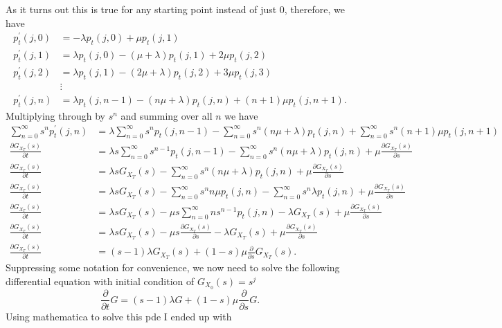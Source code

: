 \documentclass[10pt]{amsart}
\begin{document}
As it turns out this is true for any starting point instead of just 0, therefore, we have
\begin{align*}
p^\prime_t(j,0) &= -\lambda p_t(j,0) + \mu p_t(j,1) \\
p^\prime_t(j,1) &= \lambda p_t(j,0) - (\mu + \lambda) p_t(j,1) + 2\mu p_t(j,2) \\
p^\prime_t(j,2) &= \lambda p_t(j,1) - (2\mu + \lambda) p_t(j,2) + 3\mu p_t(j,3) \\
& \vdots \\
p^\prime_t(j,n) &= \lambda p_t(j,n-1) - (n\mu + \lambda) p_t(j,n) + (n + 1)\mu p_t(j,n+1).
\end{align*}
Multiplying through by $s^n$ and summing over all $n$ we have
\begin{align*}
\sum_{n=0}^\infty s^n p^\prime_t(j,n)
	&= \lambda \sum_{n=0}^\infty s^n p_t(j,n-1) - \sum_{n=0}^\infty s^n  (n\mu + \lambda) p_t(j,n) + \sum_{n=0}^\infty s^n (n + 1)\mu p_t(j,n+1) \\
\frac {\partial G_{X_T}(s)}{\partial t}
	&= \lambda s \sum_{n=0}^\infty s^{n - 1} p_t(j,n-1) - \sum_{n=0}^\infty s^n  (n\mu + \lambda) p_t(j,n) + \mu \frac {\partial G_{X_T}(s)}{\partial s} \\
\frac {\partial G_{X_T}(s)}{\partial t}
	&= \lambda s G_{X_T}(s) - \sum_{n=0}^\infty s^n  (n\mu + \lambda) p_t(j,n) + \mu \frac {\partial G_{X_T}(s)}{\partial s} \\
\frac {\partial G_{X_T}(s)}{\partial t}
	&= \lambda s G_{X_T}(s) - \sum_{n=0}^\infty s^n n\mu p_t(j,n) - \sum_{n=0}^\infty s^n \lambda p_t(j,n) + \mu \frac {\partial G_{X_T}(s)}{\partial s} \\
\frac {\partial G_{X_T}(s)}{\partial t}
	&= \lambda s G_{X_T}(s) - \mu s \sum_{n=0}^\infty ns^{n-1} p_t(j,n) - \lambda G_{X_T}(s) + \mu \frac {\partial G_{X_T}(s)}{\partial s} \\
\frac {\partial G_{X_T}(s)}{\partial t}
	&= \lambda s G_{X_T}(s) - \mu s \frac {\partial G_{X_T}(s)}{\partial s} - \lambda G_{X_T}(s) + \mu \frac {\partial G_{X_T}(s)}{\partial s} \\
\frac {\partial G_{X_T}(s)}{\partial t}
	&= (s - 1) \lambda G_{X_T}(s) + (1 - s)\mu \frac {\partial }{\partial s}G_{X_T}(s).
\end{align*}
Suppressing some notation for convenience, we now need to solve the following differential equation with initial condition of $G_{X_0}(s) = s^j$
$$
\frac {\partial}{\partial t} G
	= (s - 1) \lambda G + (1 - s)\mu \frac {\partial }{\partial s}G.
$$
Using mathematica to solve this pde I ended up with
\end{document}
